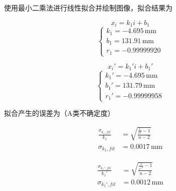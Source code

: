 \documentclass[10pt, twocolumn]{article}
\begin{document}
\par
使用最小二乘法进行线性拟合并绘制图像，拟合结果为\\
\begin{minipage}{0.23\textwidth}
    \begin{equation*}
        x_i=k_1i+b_1
    \end{equation*}
    \begin{equation*}
    \begin{cases}
        k_1 = -4.695\,\text{mm} \\
        b_1 = 131.91\,\text{mm} \\
        r_1 = -0.99999920
    \end{cases}
    \end{equation*}
\end{minipage}
\begin{minipage}{0.23\textwidth}
    \begin{equation*}
        x_i'=k_1'i+b_1'
    \end{equation*}
    \begin{equation*}
    \begin{cases}
        k_1' = -4.695\,\text{mm} \\
        b_1' = 131.79\,\text{mm} \\
        r_1' = -0.99999958
    \end{cases}
    \end{equation*}
\end{minipage}
\par 
拟合产生的误差为（A类不确定度）\\
\begin{minipage}{0.23\textwidth}
\begin{equation*}
    \begin{aligned}
        \frac{\sigma_{k_1,fit}}{k_1} &= \sqrt{\frac{\frac{1}{r^2}-1}{n-2}} \\
        \sigma_{k_1,fit} &= 0.0017\,\text{mm}
    \end{aligned}
\end{equation*}
\end{minipage}
\begin{minipage}{0.23\textwidth}
\begin{equation*}
    \begin{aligned}
        \frac{\sigma_{k_1',fit}}{k_1'} &= \sqrt{\frac{\frac{1}{r'^2}-1}{n-2}} \\
        \sigma_{k_1',fit} &= 0.0012\,\text{mm}
    \end{aligned}
\end{equation*}
\end{minipage}
\end{document}
